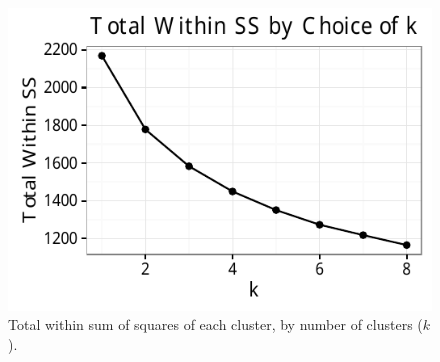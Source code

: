 \documentclass[12pt,twoside]{reedthesis}
\begin{document}
  \begin{figure}[tbh]
  \centering
  \includegraphics[angle = 0,scale = 1]{figure/choice_k.pdf}
  \caption[Total within sum of squares of each cluster, by number of clusters ($k$).]{\normalsize{Total within sum of squares of each cluster, by number of clusters ($k$).}}
  \label{fig:choosing_k}
  \end{figure}
  
\end{document}
